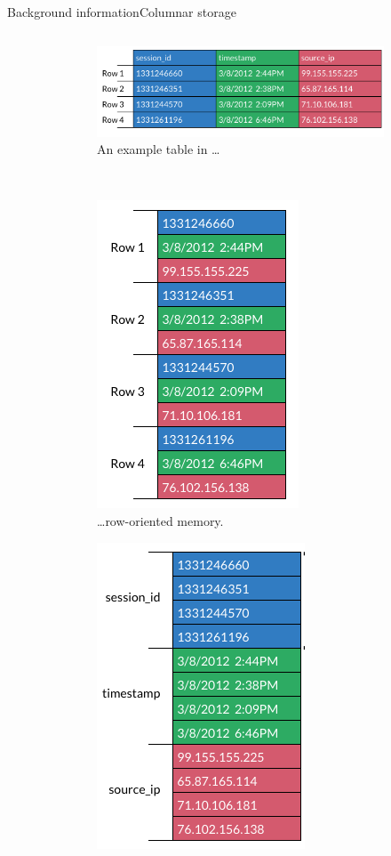 \begin{frame}[t]{Background information}{Columnar storage}
\begin{columns}[t]
\begin{column}[t]{0.4\linewidth}
\begin{itemize}
			\end{itemize}
		\end{column}
		\hfill
		\begin{column}{0.6\linewidth}
			\begin{figure}
				\centering
				\begin{subfigure}{0.8\linewidth}
					\centering
					\includegraphics[height=0.2\FrameHeight]{assets/table-example}
					\caption{An example table in \dots}
				\end{subfigure}
				\\
				\begin{subfigure}{0.4\linewidth}
					\centering
					\includegraphics[height=0.3\FrameHeight]{assets/table-row}
					\caption{\dots row-oriented memory.}
				\end{subfigure}
				\begin{subfigure}{0.4\linewidth}
					\centering
					\includegraphics[height=0.3\FrameHeight]{assets/table-columnar}

\end{subfigure}
\end{figure}
\end{column}
\end{columns}
\end{frame}
